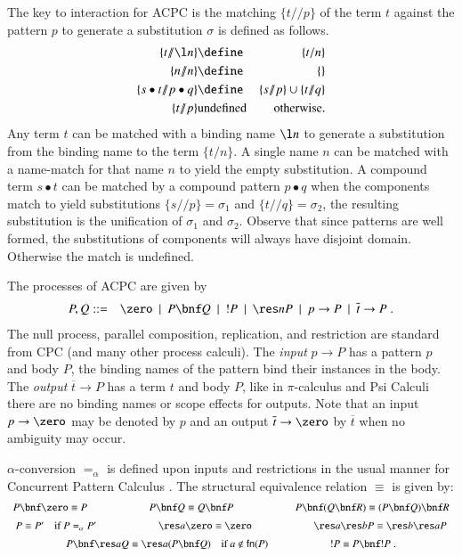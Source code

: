 \documentclass[submission,copyright,creativecommons]{eptcs}
\def\BNF{\ \  | \ \  }
\renewcommand{\iap}[1]{#1\to}
\renewcommand{\oap}[1]{\overline{#1}\to}
\newcommand{\oan}[1]{\overline{#1}}
\begin{document}
\renewcommand{\match}[2]{\{#1/\!\!/#2\}}

The key to interaction for ACPC is the matching $\match t p$ of the term $t$ against the pattern $p$
to generate a substitution $\sigma$
is defined as follows.
\begin{eqnarray*}
\match t {\l n} &\define& \{t/n\}\\
\match n n &\define& \{\}\\
\match {s\bullet t} {p\bullet q} &\define& \match s p \cup \match t q\\
\match t p &\mbox{undefined}& \mbox{otherwise.}
\end{eqnarray*}
Any term $t$ can be matched with a binding name $\l n$ to generate a substitution from the
binding name to the term $\{t/n\}$.
A single name $n$ can be matched with a name-match for that name $n$ to yield the
empty substitution.
A compound term $s\bullet t$ can be matched by a compound pattern $p\bullet q$ when
the components match to yield substitutions $\match s p=\sigma_1$ and $\match t q=\sigma_2$,
the resulting substitution is the unification of $\sigma_1$ and $\sigma_2$.
Observe that since patterns are well formed, the substitutions of components will always have
disjoint domain.
Otherwise the match is undefined.

The processes of ACPC are given by
\begin{eqnarray*}
P,Q &::=& \zero\BNF P\bnf Q\BNF !P\BNF \res n P\BNF \iap p P\BNF \oap t P\; .
\end{eqnarray*}
The null process, parallel composition, replication, and restriction are standard
from CPC (and many other process calculi).
The {\em input} $\iap p P$ has a pattern $p$ and body $P$, the binding names of the pattern
bind their instances in the body.
The {\em output} $\oap t P$ has a term $t$ and body $P$, like in $\pi$-calculus and Psi
Calculi there are no binding names or scope effects for outputs.
Note that an input $\iap p \zero$ may be denoted by $p$ and an output $\oap t \zero$
by $\oan t$ when no ambiguity may occur.

$\alpha$-conversion $=_\alpha$ is defined upon inputs and restrictions in the usual manner for 
Concurrent Pattern Calculus \cite{GivenWilsonGorlaJay10}.
The structural equivalence relation $\equiv$ is given by:
\begin{equation*}
\begin{array}{c}
P\bnf \zero \equiv P
\qquad\qquad\qquad
P\bnf Q \equiv Q \bnf P
\qquad\qquad\qquad
P\bnf (Q\bnf R) \equiv (P\bnf Q)\bnf R
\vspace{0.2cm} \\
P\equiv P'\quad\mbox{if}\ P=_\alpha P'
\qquad\qquad\qquad
\res a \zero \equiv \zero
\qquad\qquad\qquad
\res a \res b P\equiv \res b \res a P
\vspace{0.2cm} \\
P\bnf \res a Q\equiv \res a (P\bnf Q)\quad \mbox{if}\ a\notin{\sf fn}(P)
\qquad\qquad\qquad
!P\equiv P\bnf !P \; .
\end{array}
\end{equation*}
\end{document}
